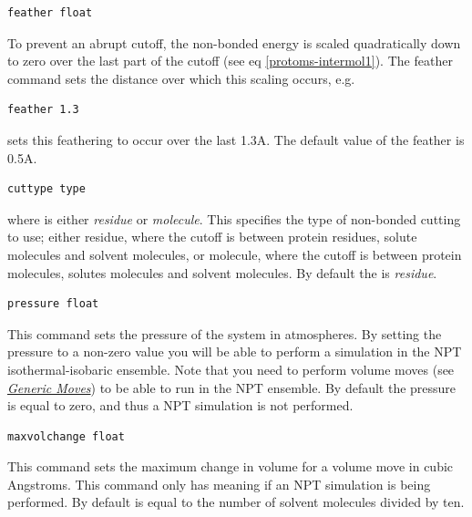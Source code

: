\documentclass[letterpaper,10pt,english]{sphinxmanual}
\begin{document}
\begin{Verbatim}[commandchars=\\\{\}]
feather float
\end{Verbatim}

To prevent an abrupt cutoff, the non-bonded energy is scaled quadratically down to zero over the last part of the cutoff (see eq \eqref{protoms-intermol1}). The feather command sets the distance over which this scaling occurs, e.g.

\begin{Verbatim}[commandchars=\\\{\}]
feather 1.3
\end{Verbatim}

sets this feathering to occur over the last 1.3A. The default value of the feather is 0.5A.

\begin{Verbatim}[commandchars=\\\{\}]
cuttype type
\end{Verbatim}

where  is either \emph{residue} or \emph{molecule}. This specifies the type of non-bonded cutting to use; either residue, where the cutoff is between protein residues, solute molecules and solvent molecules, or molecule, where the cutoff is between protein molecules, solutes molecules and solvent molecules. By default the  is \emph{residue}.

\begin{Verbatim}[commandchars=\\\{\}]
pressure float
\end{Verbatim}

This command sets the pressure of the system in atmospheres. By setting the pressure to a non-zero value you will be able to perform a simulation in the NPT isothermal-isobaric ensemble. Note that you need to perform volume moves (see {\hyperref[protoms:moves]{\emph{Generic Moves}}}) to be able to run in the NPT ensemble. By default the pressure is equal to zero, and thus a NPT simulation is not performed.

\begin{Verbatim}[commandchars=\\\{\}]
maxvolchange float
\end{Verbatim}

This command sets the maximum change in volume for a volume move in cubic Angstroms. This command only has meaning if an NPT simulation is being performed. By default  is equal to the number of solvent molecules divided by ten.
\end{document}
